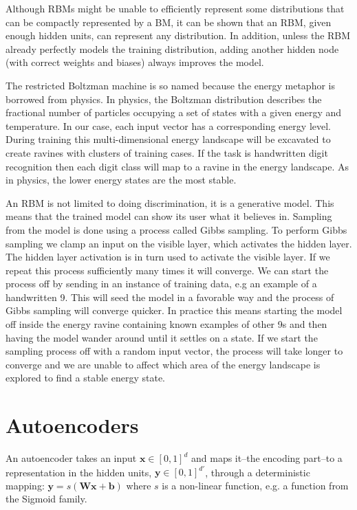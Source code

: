\documentclass[11pt]{article}
\begin{document}
Although RBMs might be unable to efficiently represent some distributions that can be compactly represented by a BM, it can be shown that an RBM, given enough hidden units, can represent any distribution\cite{le08}.  In addition, unless the RBM already perfectly models the training distribution, adding another hidden node (with correct weights and biases) always improves the model\cite{le08}.

The restricted Boltzman machine is so named because the energy metaphor is borrowed from physics.  In physics, the Boltzman distribution describes the fractional number of particles occupying a set of states with a given energy and temperature.  In our case, each input vector has a corresponding energy level.  During training this multi-dimensional energy landscape will be excavated to create ravines with clusters of training cases.  If the task is handwritten digit recognition then each digit class will map to a ravine in the energy landscape.  As in physics, the lower energy states are the most stable.

An RBM is not limited to doing discrimination, it is a generative model.  This means that the trained model can show its user what it believes in.  Sampling from the model is done using a process called Gibbs sampling.  To perform Gibbs sampling we clamp an input on the visible layer, which activates the hidden layer.  The hidden layer activation is in turn used to activate the visible layer.  If we repeat this process sufficiently many times it will converge.  We can start the process off by sending in an instance of training data, e.g an example of a handwritten 9. This will seed the model in a favorable way and the process of Gibbs sampling will converge quicker.  In practice this means starting the model off inside the energy ravine containing known examples of other 9s and then having the model wander around until it settles on a state.  If we start the sampling process off with a random input vector, the process will take longer to converge and we are unable to affect which area of the energy landscape is explored to find a stable energy state.

\section{Autoencoders}

An autoencoder takes an input $\mathbf{x} \in [0,1]^d$ and maps it--the encoding part--to a representation in the hidden units, $\mathbf{y} \in [0,1]^{d'}$, through a deterministic mapping:
 $\mathbf{y} = s(\mathbf{W}\mathbf{x} + \mathbf{b})$ where $s$ is a non-linear function, e.g. a function from the Sigmoid family.
\end{document}
